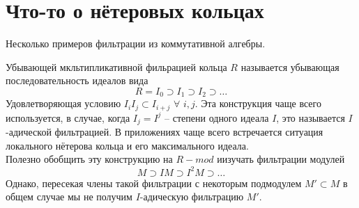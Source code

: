 \documentclass[../main.tex]{subfiles}
\begin{document}
\section{Что-то о нётеровых кольцах}
Несколько примеров фильтрации из коммутативной алгебры.
\begin{to_ex}
Убывающей мкльтипликативной фильрацией кольца $R$ называется убывающая последовательность идеалов вида 
\[
R = I_0 \supset I_1 \supset I_2 \supset \ldots
\]
Удовлетворяющая условию $I_i I_j \subset I_{i+j}$ $\forall$ $i, j$.
Эта конструкция чаще всего используется, в случае, когда $I_j = I^j$ -- степени одного идеала $I$, это называется $I$-адической фильтрацией. В приложениях чаще всего встречается ситуация локального нётерова кольца 
 и его максимального идеала.\\
 Полезно обобщить эту конструкцию на $R-mod$  иизучать фильтрации модулей
 \[M \supset IM \supset I^2 M \supset \ldots\]
 Однако, пересекая члены такой фильтрации с некоторым подмодулем $M' \subset M$ в общем случае мы не получим $I$-адическую фильтрацию $M'$.
\end{to_ex}
\end{document}

